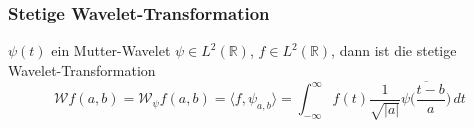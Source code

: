 %
%
%
\begin{frame}
\frametitle{Stetige Wavelet-Transformation}


\begin{definition}
$\psi(t)$ ein Mutter-Wavelet $\psi\in L^2(\mathbb R)$, $f\in L^2(\mathbb R)$,
dann ist die stetige Wavelet-Transformation
\[
\mathcal{W}f(a,b)
=
\mathcal{W}_{\psi}f(a,b)
=
\langle f,\psi_{a,b}\rangle
=
\int_{-\infty}^\infty f(t)\frac{1}{\sqrt{|a|}}\overline{\psi\biggl(
\frac{t-b}a\biggr)}\,dt
\]
\end{definition}


\end{frame}
